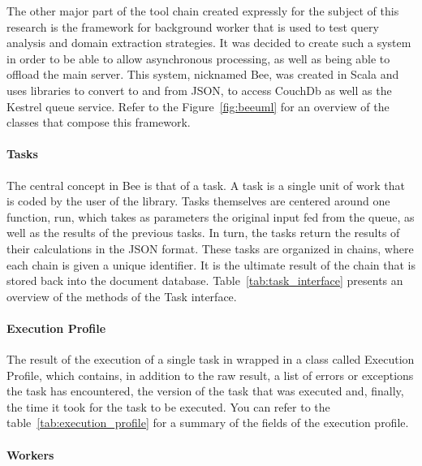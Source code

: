 The other major part of the tool chain created expressly for the subject of this research is the framework for background worker that is used to test query analysis and domain extraction strategies. It was decided to create such a system in order to be able to allow asynchronous processing, as well as being able to offload the main server. This system, nicknamed Bee, was created in Scala and uses libraries to convert to and from JSON, to access CouchDb as well as the Kestrel queue service. Refer to the Figure~\ref{fig:beeuml} for an overview of the classes that compose this framework.

\paragraph{Tasks} %
\label{par:tasks}

The central concept in Bee is that of a task. A task is a single unit of work that is coded by the user of the library.  Tasks themselves are centered around one function, run, which takes as parameters the original input fed from the queue, as well as the results of the previous tasks. In turn, the tasks return the results of their calculations in the JSON format. These tasks are organized in chains, where each chain is given a unique identifier. It is the ultimate result of the chain that is stored back into the document database. Table~\ref{tab:task_interface} presents an overview of the methods of the Task interface.


\paragraph{Execution Profile} %
\label{par:execution_profile}

The result of the execution of a single task in wrapped in a class called Execution Profile, which contains, in addition to the raw result, a list of errors or exceptions the task has encountered, the version of the task that was executed and, finally, the time it took for the task to be executed. You can refer to the table~\ref{tab:execution_profile} for a summary of the fields of the execution profile.


\paragraph{Workers} %
\label{par:workers}

